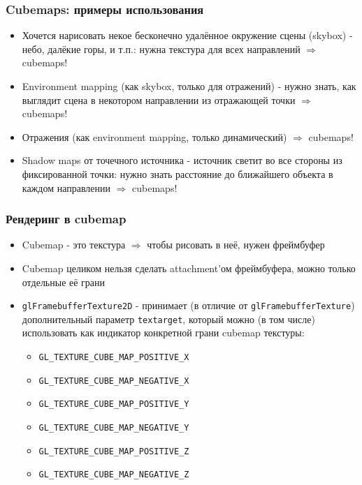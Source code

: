 \documentclass{beamer}
\begin{document}
\begin{frame}[fragile]
\frametitle{Cubemaps: примеры использования}
\begin{itemize}
\item Хочется нарисовать некое бесконечно удалённое окружение сцены (skybox) - небо, далёкие горы, и т.п.: нужна текстура для всех направлений \begin{math}\Rightarrow\end{math} cubemaps!
\pause
\item Environment mapping (как skybox, только для отражений) - нужно знать, как выглядит сцена в некотором направлении из отражающей точки \begin{math}\Rightarrow\end{math} cubemaps!
\pause
\item Отражения (как environment mapping, только динамический) \begin{math}\Rightarrow\end{math} cubemaps!
\pause
\item Shadow maps от точечного источника - источник светит во все стороны из фиксированной точки: нужно знать расстояние до ближайшего объекта в каждом направлении \begin{math}\Rightarrow\end{math} cubemaps!
\end{itemize}
\end{frame}

\begin{frame}[fragile]
\frametitle{Рендеринг в cubemap}
\begin{itemize}
\item Cubemap - это текстура \begin{math}\Rightarrow\end{math} чтобы рисовать в неё, нужен фреймбуфер
\pause
\item Cubemap целиком нельзя сделать attachment'ом фреймбуфера, можно только отдельные её грани
\pause
\item \verb|glFramebufferTexture2D| - принимает (в отличие от \verb|glFramebufferTexture|) дополнительный параметр \verb|textarget|, который можно (в том числе) использовать как индикатор конкретной грани cubemap текстуры:
\begin{itemize}
\item \verb|GL_TEXTURE_CUBE_MAP_POSITIVE_X|
\item \verb|GL_TEXTURE_CUBE_MAP_NEGATIVE_X|
\item \verb|GL_TEXTURE_CUBE_MAP_POSITIVE_Y|
\item \verb|GL_TEXTURE_CUBE_MAP_NEGATIVE_Y|
\item \verb|GL_TEXTURE_CUBE_MAP_POSITIVE_Z|
\item \verb|GL_TEXTURE_CUBE_MAP_NEGATIVE_Z|
\end{itemize}
\end{itemize}
\end{frame}
\end{document}
